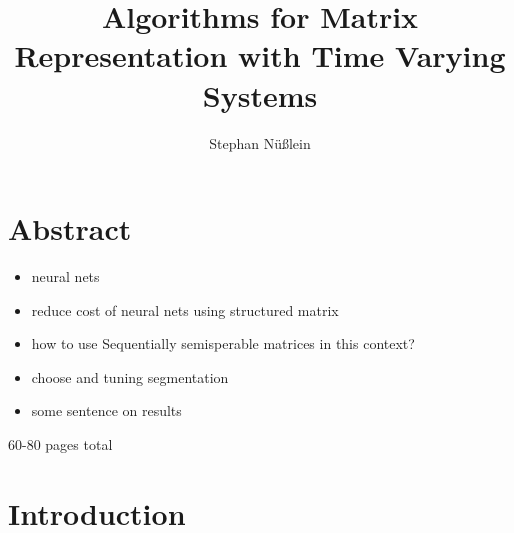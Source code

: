 \documentclass[doctype=mastersthesis,BCOR=15mm,biblatex]{ldvbook}%
\begin{document}
\title{Algorithms for Matrix Representation with Time Varying Systems}
%
\author{Stephan Nüßlein}


\maketitle[frontcover=Design1]


\chapter*{Abstract}

\begin{itemize}
	\item neural nets
	\item reduce cost of neural nets using structured matrix
	\item how to use Sequentially semisperable matrices in this context?
	\item choose and tuning segmentation
	\item some sentence on results
\end{itemize}


\tableofcontents

60-80 pages total







\chapter{Introduction} 
\end{document}
